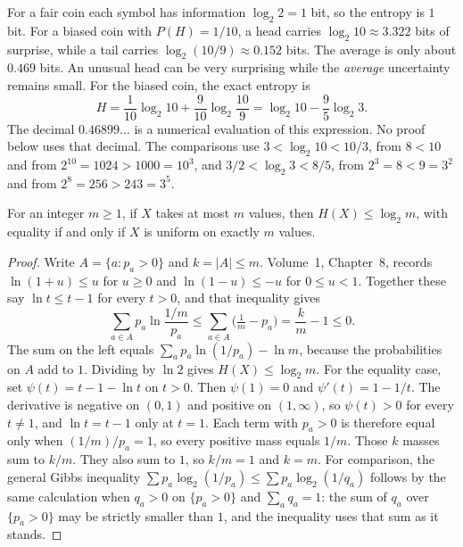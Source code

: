For a fair coin each symbol has information $\log_2 2=1$ bit, so the entropy is $1$ bit. For a biased coin with $P(H)=1/10$, a head carries $\log_2 10\approx3.322$ bits of surprise, while a tail carries $\log_2(10/9)\approx0.152$ bits. The average is only about $0.469$ bits. An unusual head can be very surprising while the \emph{average} uncertainty remains small. For the biased coin, the exact entropy is
\[
 H=\frac1{10}\log_2 10+\frac9{10}\log_2\frac{10}9=\log_2 10-\frac95\log_2 3.
\]
The decimal $0.46899\ldots$ is a numerical evaluation of this expression. No proof below uses that decimal. The comparisons use $3<\log_2 10<10/3$, from $8<10$ and from $2^{10}=1024>1000=10^3$, and $3/2<\log_2 3<8/5$, from $2^3=8<9=3^2$ and from $2^8=256>243=3^5$.

\begin{proposition}[Gibbs]\label{prop:gibbs}
For an integer $m\ge1$, if $X$ takes at most $m$ values, then $H(X)\le\log_2 m$, with equality if and only if $X$ is uniform on exactly $m$ values.
\end{proposition}
\begin{proof}
Write $A=\{a:p_a>0\}$ and $k=|A|\le m$. Volume~1, Chapter~8, records $\ln(1+u)\le u$ for $u\ge0$ and $\ln(1-u)\le -u$ for $0\le u<1$. Together these say $\ln t\le t-1$ for every $t>0$, and that inequality gives
\[
\sum_{a\in A}p_a\ln\frac{1/m}{p_a}\le\sum_{a\in A}\bigl(\tfrac1m-p_a\bigr)=\frac{k}{m}-1\le0.
\]
The sum on the left equals $\sum_a p_a\ln(1/p_a)-\ln m$, because the probabilities on $A$ add to $1$. Dividing by $\ln 2$ gives $H(X)\le\log_2 m$. For the equality case, set $\psi(t)=t-1-\ln t$ on $t>0$. Then $\psi(1)=0$ and $\psi'(t)=1-1/t$. The derivative is negative on $(0,1)$ and positive on $(1,\infty)$, so $\psi(t)>0$ for every $t\ne1$, and $\ln t=t-1$ only at $t=1$. Each term with $p_a>0$ is therefore equal only when $(1/m)/p_a=1$, so every positive mass equals $1/m$. Those $k$ masses sum to $k/m$. They also sum to $1$, so $k/m=1$ and $k=m$. For comparison, the general Gibbs inequality $\sum p_a\log_2(1/p_a)\le\sum p_a\log_2(1/q_a)$ follows by the same calculation when $q_a>0$ on $\{p_a>0\}$ and $\sum_aq_a=1$: the sum of $q_a$ over $\{p_a>0\}$ may be strictly smaller than $1$, and the inequality uses that sum as it stands.
\end{proof}


